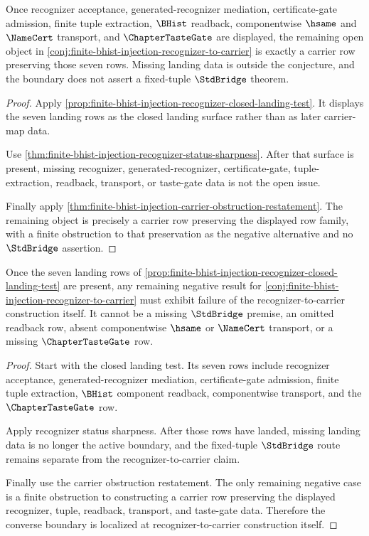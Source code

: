 \begin{theorem}
\label{thm:finite-bhist-injection-recognizer-closed-landing-boundary}
Once recognizer acceptance, generated-recognizer mediation, certificate-gate admission, finite tuple extraction, $\BHist$ readback, componentwise $\hsame$ and $\NameCert$ transport, and $\ChapterTasteGate$ are displayed, the remaining open object in \autoref{conj:finite-bhist-injection-recognizer-to-carrier} is exactly a carrier row preserving those seven rows. Missing landing data is outside the conjecture, and the boundary does not assert a fixed-tuple $\StdBridge$ theorem.
\end{theorem}
\begin{proof}
Apply \autoref{prop:finite-bhist-injection-recognizer-closed-landing-test}. It displays the seven landing rows as the closed landing surface rather than as later carrier-map data.

Use \autoref{thm:finite-bhist-injection-recognizer-status-sharpness}. After that surface is present, missing recognizer, generated-recognizer, certificate-gate, tuple-extraction, readback, transport, or taste-gate data is not the open issue.

Finally apply \autoref{thm:finite-bhist-injection-carrier-obstruction-restatement}. The remaining object is precisely a carrier row preserving the displayed row family, with a finite obstruction to that preservation as the negative alternative and no $\StdBridge$ assertion.
\end{proof}

\begin{theorem}
\label{thm:finite-bhist-injection-readback-converse-boundary}
Once the seven landing rows of \autoref{prop:finite-bhist-injection-recognizer-closed-landing-test} are present, any remaining negative result for \autoref{conj:finite-bhist-injection-recognizer-to-carrier} must exhibit failure of the recognizer-to-carrier construction itself. It cannot be a missing $\StdBridge$ premise, an omitted readback row, absent componentwise $\hsame$ or $\NameCert$ transport, or a missing $\ChapterTasteGate$ row.
\end{theorem}
\begin{proof}
Start with the closed landing test. Its seven rows include recognizer acceptance, generated-recognizer mediation, certificate-gate admission, finite tuple extraction, $\BHist$ component readback, componentwise transport, and the $\ChapterTasteGate$ row.

Apply recognizer status sharpness. After those rows have landed, missing landing data is no longer the active boundary, and the fixed-tuple $\StdBridge$ route remains separate from the recognizer-to-carrier claim.

Finally use the carrier obstruction restatement. The only remaining negative case is a finite obstruction to constructing a carrier row preserving the displayed recognizer, tuple, readback, transport, and taste-gate data. Therefore the converse boundary is localized at recognizer-to-carrier construction itself.
\end{proof}

